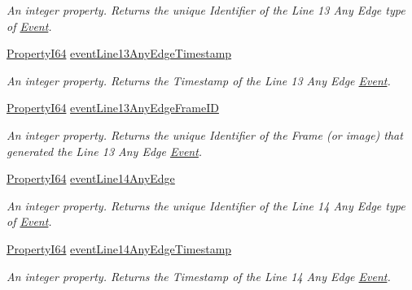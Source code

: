 \begin{DoxyCompactItemize}
\begin{DoxyCompactList}\small\item\em An integer property. Returns the unique Identifier of the Line 13 Any Edge type of \hyperlink{classmv_i_m_p_a_c_t_1_1acquire_1_1_event}{Event}. \end{DoxyCompactList}\item 
\hyperlink{group___common_interface_ga81749b2696755513663492664a18a893}{Property\+I64} \hyperlink{classmv_i_m_p_a_c_t_1_1acquire_1_1_gen_i_cam_1_1_event_control_a751a00c428e040180a36563b05870fad}{event\+Line13\+Any\+Edge\+Timestamp}
\begin{DoxyCompactList}\small\item\em An integer property. Returns the Timestamp of the Line 13 Any Edge \hyperlink{classmv_i_m_p_a_c_t_1_1acquire_1_1_event}{Event}. \end{DoxyCompactList}\item 
\hyperlink{group___common_interface_ga81749b2696755513663492664a18a893}{Property\+I64} \hyperlink{classmv_i_m_p_a_c_t_1_1acquire_1_1_gen_i_cam_1_1_event_control_a0b9db25af19bc2301161f78e124f90be}{event\+Line13\+Any\+Edge\+Frame\+I\+D}
\begin{DoxyCompactList}\small\item\em An integer property. Returns the unique Identifier of the Frame (or image) that generated the Line 13 Any Edge \hyperlink{classmv_i_m_p_a_c_t_1_1acquire_1_1_event}{Event}. \end{DoxyCompactList}\item 
\hyperlink{group___common_interface_ga81749b2696755513663492664a18a893}{Property\+I64} \hyperlink{classmv_i_m_p_a_c_t_1_1acquire_1_1_gen_i_cam_1_1_event_control_a39142f7b128ef3901b2f2c36b0b16cbd}{event\+Line14\+Any\+Edge}
\begin{DoxyCompactList}\small\item\em An integer property. Returns the unique Identifier of the Line 14 Any Edge type of \hyperlink{classmv_i_m_p_a_c_t_1_1acquire_1_1_event}{Event}. \end{DoxyCompactList}\item 
\hyperlink{group___common_interface_ga81749b2696755513663492664a18a893}{Property\+I64} \hyperlink{classmv_i_m_p_a_c_t_1_1acquire_1_1_gen_i_cam_1_1_event_control_a9ef439b22a96cfdaa77641b6008f54c2}{event\+Line14\+Any\+Edge\+Timestamp}
\begin{DoxyCompactList}\small\item\em An integer property. Returns the Timestamp of the Line 14 Any Edge \hyperlink{classmv_i_m_p_a_c_t_1_1acquire_1_1_event}{Event}. \end{DoxyCompactList}\item 

\end{DoxyCompactItemize}
